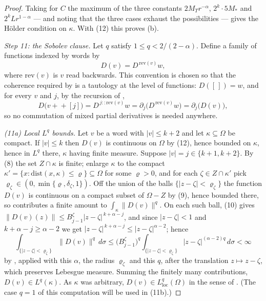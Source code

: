 \begin{proof}
Taking for $C$ the maximum of the three constants
$2M_Tr^{-\alpha}$, $2^{k}\cdot5M_{*}$ and $2^{k}Lr^{1-\alpha}$ --- and noting
that the three cases exhaust the possibilities --- gives the H\"older condition
on $\kappa$.  With (12) this proves (b).

\emph{Step 11: the Sobolev clause.}  Let $q$ satisfy $1\le q<2/(2-\alpha)$.
Define a family of functions indexed by words by
\[
  D(v)=D^{\,\mathrm{rev}(v)}w ,
\]
where $\mathrm{rev}(v)$ is $v$ read backwards.  This convention is chosen so
that the coherence required by  is a tautology at the level
of functions: $D([\,])=w$, and for every $v$ and $j$, by the recursion of
,
\begin{equation}\tag{14}
  D\bigl(v+\!\!+[j]\bigr)=D^{\,j::\mathrm{rev}(v)}w
  =\partial_j\bigl(D^{\,\mathrm{rev}(v)}w\bigr)=\partial_j\bigl(D(v)\bigr),
\end{equation}
so no commutation of mixed partial derivatives is needed anywhere.

\emph{(11a) Local $L^{q}$ bounds.}  Let $v$ be a word with $|v|\le k+2$ and let
$\kappa\subseteq\Omega$ be compact.  If $|v|\le k$ then $D(v)$ is continuous on
$\Omega$ by (12), hence bounded on $\kappa$, hence in $L^{q}$ there, $\kappa$
having finite measure.  Suppose $|v|=j\in\{k+1,k+2\}$.  By (8) the set
$Z\cap\kappa$ is finite; enlarge $\kappa$ to the compact
$\kappa'=\{x:\mathrm{dist}(x,\kappa)\le\varrho\}\subseteq\Omega$ for some
$\varrho>0$, and for each $\zeta\in Z\cap\kappa'$ pick
$\varrho_\zeta\in(0,\min\{\varrho,\delta_\zeta,1\})$.  Off the union of the
balls $\{|z-\zeta|<\varrho_\zeta\}$ the function $D(v)$ is continuous on a
compact subset of $\Omega-Z$ by (9), hence bounded there, so contributes a
finite amount to $\int_{\kappa}\|D(v)\|^{q}$.  On each such ball, (10) gives
$\|D(v)(z)\|\le B^{\zeta}_{j-1}|z-\zeta|^{\,k+\alpha-j}$, and since
$|z-\zeta|<1$ and $k+\alpha-j\ge\alpha-2$ we get
$|z-\zeta|^{\,k+\alpha-j}\le|z-\zeta|^{\alpha-2}$; hence
\[
  \int_{\{|z-\zeta|<\varrho_\zeta\}}\|D(v)\|^{q}\,d\sigma
  \le\bigl(B^{\zeta}_{j-1}\bigr)^{q}
  \int_{\{|z-\zeta|<\varrho_\zeta\}}|z-\zeta|^{(\alpha-2)q}\,d\sigma<\infty
\]
by , applied with this $\alpha$, the radius
$\varrho_\zeta$ and this $q$, after the translation $z\mapsto z-\zeta$, which
preserves Lebesgue measure.  Summing the finitely many contributions,
$D(v)\in L^{q}(\kappa)$.  As $\kappa$ was arbitrary,
$D(v)\in L^{q}_{\mathrm{loc}}(\Omega)$ in the sense of .
(The case $q=1$ of this computation will be used in (11b).)


\end{proof}

